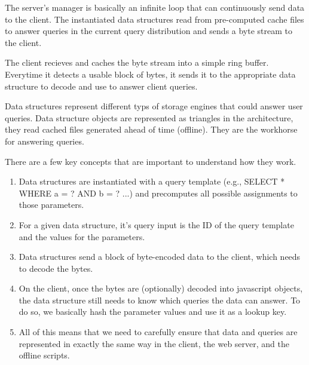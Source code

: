 The server's manager is basically an infinite loop that can continuously send data to the client. The instantiated data structures read from pre-computed cache files to answer queries in the current query distribution and sends a byte stream to the client.

The client recieves and caches the byte stream into a simple ring buffer. Everytime it detects a usable block of bytes, it sends it to the appropriate data structure to decode and use to answer client queries.


Data structures represent different typs of storage engines that could answer user queries. Data structure objects are represented as triangles in the architecture, they read cached files generated ahead of time (offline). They are the workhorse for answering queries.

There are a few key concepts that are important to understand how they work.

\begin{enumerate}
\item Data structures are instantiated with a query template (e.g., SELECT * WHERE a = ? AND b = ? ...) and precomputes all possible assignments to those parameters.
\item For a given data structure, it's query input is the ID of the query template and the values for the parameters.
\item Data structures send a block of byte-encoded data to the client, which needs to decode the bytes.
\item On the client, once the bytes are (optionally) decoded into javascript objects, the data structure still needs to know which queries the data can answer. To do so, we basically hash the parameter values and use it as a lookup key.
\item All of this means that we need to carefully ensure that data and queries are represented in exactly the same way in the client, the web server, and the offline scripts.
\end{enumerate}
